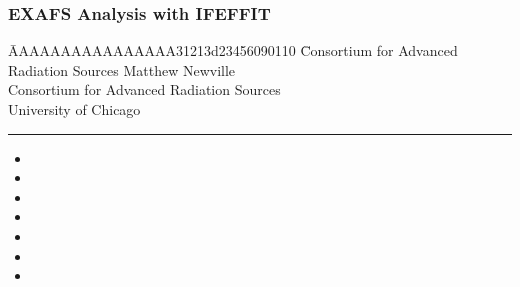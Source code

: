 \begin{frame} \frametitle{EXAFS Analysis with IFEFFIT}
  \small
  \begin{cenpage}{100mm}\setlength{\baselineskip}{11pt}
    
    
    \small
    \begin{tabbing}[ll]
      \=  AAAAAAAAAAAAAAAA31213d23456090110 \= 
      {Consortium for Advanced Radiation Sources} \kill 
      \> \> {Matthew Newville} \\
      \> \> {Consortium for Advanced Radiation Sources} \\
      \> \> {University of Chicago}  \\
    \end{tabbing}
    
    \vspace{-2mm}
    
    \hrule \vmm \vmm \vmm

    \begin{cenpage}{80mm}
    
    \begin{itemize}
      
    \item {}
      
    \item {}

    \item {}
        
    \item {}

    \item {}
      
    \item {}

    \item {}

    \end{itemize}

  \end{cenpage}
\end{cenpage}

    
\vfill
\end{frame}


